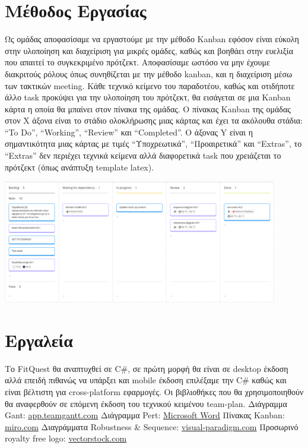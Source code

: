\documentclass{article}
\begin{document}
\section{Μέθοδος Εργασίας}
Ως ομάδας αποφασίσαμε να εργαστούμε με την μέθοδο Kanban εφόσον είναι εύκολη στην υλοποίηση και διαχείριση για μικρές ομάδες, καθώς και βοηθάει στην ευελιξία που απαιτεί το συγκεκριμένο πρότζεκτ. Αποφασίσαμε ωστόσο να μην έχουμε διακριτούς ρόλους όπως συνηθίζεται με την μέθοδο kanban, και η διαχείριση μέσω των τακτικών meeting. Κάθε τεχνικό κείμενο του παραδοτέου, καθώς και οτιδήποτε άλλο task προκύψει για την υλοποίηση του πρότζεκτ, θα εισάγεται σε μια Kanban κάρτα η οποία θα μπαίνει στον πίνακα της ομάδας. 
Ο πίνακας Kanban της ομάδας στον X άξονα είναι το στάδιο ολοκλήρωσης μιας κάρτας και έχει τα ακόλουθα στάδια: “To Do”, “Working”, “Review” και “Completed”. O άξονας Y είναι η σημαντικότητα μιας κάρτας με τιμές “Υποχρεωτικά”, “Προαιρετικά” και “Extras”, το “Extras” δεν περιέχει τεχνικά κείμενα αλλά διαφορετικά task που χρειάζεται το πρότζεκτ (όπως ανάπτυξη template latex).

\vspace{20px}
\begin{center}
   \includegraphics[width=0.9\textwidth]{kanban.png}
\end{center}

\section{Εργαλεία}
Το FitQuest θα αναπτυχθεί σε C\#, σε πρώτη μορφή θα είναι σε desktop έκδοση αλλά επειδή πιθανώς να υπάρξει και mobile έκδοση επιλέξαμε την C\# καθώς και είναι βέλτιστη για cross-platform εφαρμογές. Οι βιβλιοθήκες που θα χρησιμοποιηθούν θα αναφερθούν σε επόμενη έκδοση του τεχνικού κειμένου team-plan.\newline
Διάγραμμα Gant: \href{https://app.teamgantt.com}{app.teamgantt.com}\newline
Διάγραμμα Pert: \href{https://www.microsoft.com/el-gr/microsoft-365/word}{Microsoft Word}\newline
Πίνακας Kanban: \href{www.miro.com}{miro.com}\newline
Διαγράμματα Robustness \& Sequence: \href{https://www.visual-paradigm.com}{visual-paradigm.com}\newline
Προσωρινό royalty free logo: \href{https://www.Vectorstock.com/royalty-free-vector/rpg-creative-icon-from-gaming-icons-collection-vector-45969591}{vectorstock.com}
\end{document}
